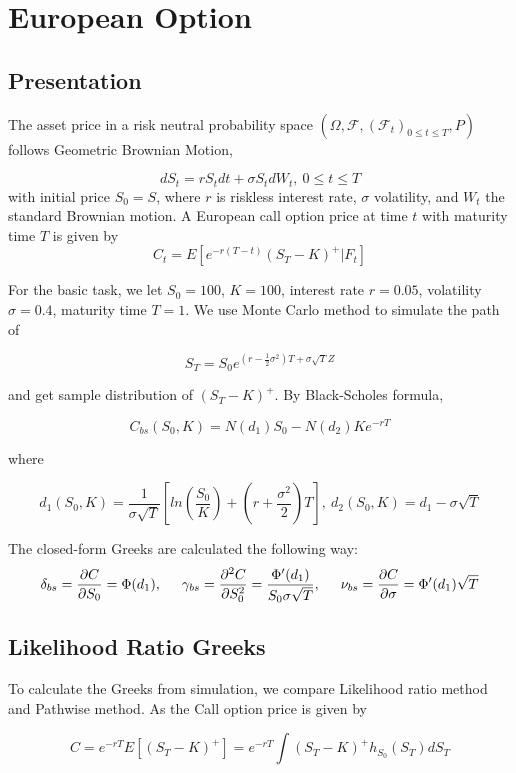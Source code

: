\documentclass[11pt,a4paper,fleqn]{article}
\begin{document}
\FloatBarrier

\section{European Option}

\subsection{Presentation}
The asset price in a risk neutral probability space $(\Omega, \mathcal{F}, (\mathcal{F}_t)_{0\leq t\leq T}, P)$ follows Geometric Brownian Motion,

$$dS_t=rS_tdt+\sigma S_tdW_t, \ 0\leq t \leq T$$
with initial price $S_0 = S$, where $r$ is riskless interest rate, $\sigma$ volatility, and $W_t$ the standard Brownian motion. A European call option price at time $t$ with maturity time $T$ is given by
$$C_t = E[e^{-r(T-t)}(S_T-K)^+|\textit{F}_t]$$

For the basic task, we let $S_0 = 100$, $K=100$, interest rate $r = 0.05$, volatility $\sigma = 0.4$, maturity time $T =1$. We use Monte Carlo method to simulate the path of

$$S_T=S_0e^{(r-\frac{1}{2}\sigma ^2)T+\sigma \sqrt{T}Z} $$

and get sample distribution of $(S_T-K)^+$. By Black-Scholes formula,


$$C_{bs}(S_0, K) = N(d_1)S_0 - N(d_2)Ke^{-rT}$$

where

$$d_1(S_0,K)=\frac{1}{\sigma \sqrt{T}}[ln(\frac{S_0}{K})+(r+\frac{\sigma^2}{2})T],\ d_2(S_0,K) = d_1-\sigma \sqrt{T}$$

The closed-form Greeks are calculated the following way:
$$\delta_{bs} = \frac{\partial C}{\partial S_0}=\Phi(d_1),\hspace*{.5cm} \gamma_{bs} = \frac{\partial^2 C}{\partial S_0^2}=\frac{\Phi'(d_1)}{S_0\sigma \sqrt{T}},\hspace*{.5cm} \nu_{bs} =  \frac{\partial C}{\partial \sigma}=\Phi'(d_1)\sqrt{T}$$

\subsection{Likelihood Ratio Greeks}
To calculate the Greeks from simulation, we compare Likelihood ratio method and Pathwise method. As the Call option price is given by

$$C = e^{-rT}E[(S_T-K)^+]=e^{-rT}\int(S_T-K)^+ h_{S_0}(S_T) dS_T$$
\end{document}
